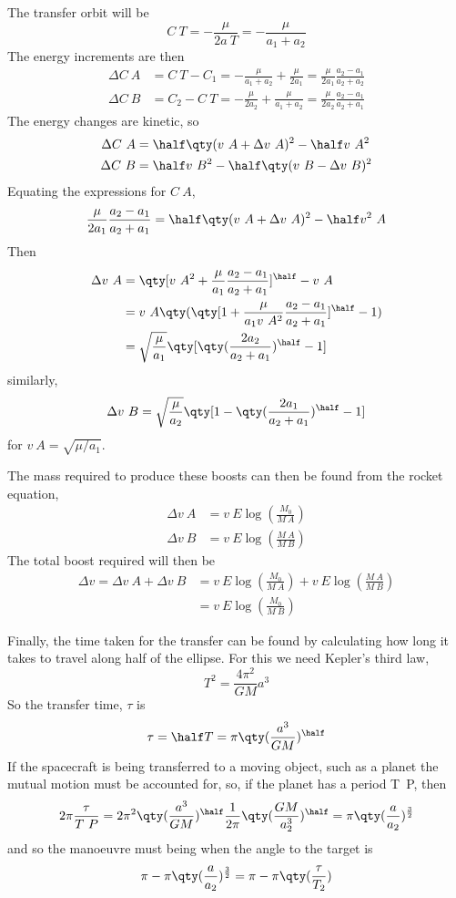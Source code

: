The transfer orbit will be
\[ C~T = - \frac{\mu}{2 a~T} = - \frac{\mu}{a_1+a_2} \]
The energy increments are then
\begin{align*}
  \Delta C~A &= C~T - C_1 = - \frac{\mu}{a_1+a_2} + \frac{\mu}{2 a_1} = \frac{\mu}{2 a_1} \frac{a_2-a_1}{a_2+a_2} \\
\Delta C~B &= C_2 - C~T = - \frac{\mu}{2 a_2} + \frac{\mu}{a_1+a_2} = \frac{\mu}{2a_2} \frac{a_2-a_1}{a_2+ a_1}
\end{align*}
The energy changes are kinetic, so
\begin{align*}
  \Delta C~A &= \half \qty( v~A + \Delta v~A)^2 - \half v~A^2 \\
\Delta C~B &= \half v~B^2 - \half \qty(v~B - \Delta v~B)^2
\end{align*}
Equating the expressions for $C~A$, 
\[ \frac{\mu}{2 a_1} \frac{a_2-a_1}{a_2+a_1} = \half \qty( v~A + \Delta v~A)^2 - \half v^2~A \]
Then
\begin{align}
  \Delta v~A &= \qty[ v~A^2 + \frac{\mu}{a_1} \frac{a_2-a_1}{a_2+a_1}]^{\half} - v~A \nonumber\\
&= v~A \qty( \qty[1+ \frac{\mu}{a_1 v~A^2} \frac{a_2-a_1}{a_2+a_1}]^{\half}-1) \nonumber\\
&= \sqrt{\frac{\mu}{a_1}} \qty[ \qty( \frac{2a_2}{a_2+a_1} )^{\half}-1]
\end{align}
similarly,
\begin{equation}
  \label{eq:4}
  \Delta v~B = \sqrt{\frac{\mu}{a_2}} \qty[ 1-\qty(\frac{2 a_1}{a_2+a_1})^{\half}-1]
\end{equation}
for $v~A = \sqrt{\mu/a_1}$.

The mass required to produce these boosts can then be found from the rocket equation,
\begin{align*}
  \Delta v~A &= v~E \log(\frac{M_0}{M~A}) \\
  \Delta v~B &= v~E \log(\frac{M~A}{M~B})
\end{align*}
The total boost required will then be
\begin{align*} \Delta v = \Delta v~A + \Delta v~B &= v~E \log( \frac{M_0}{M~A} ) + v~E \log( \frac{M~A}{M~B} ) \\ &= v~E \log( \frac{M_0}{M~B} ) 
\end{align*}

Finally, the time taken for the transfer can be found by calculating
how long it takes to travel along half of the ellipse. For this we
need Kepler's third law, 
\begin{equation}
  \label{eq:6}
  T^2 = \frac{4 \pi^2}{GM} a^3
\end{equation}
So the transfer time, $\tau$ is
\begin{equation}
  \label{eq:7}
  \tau = \half T = \pi \qty( \frac{a^3}{GM})^{\half}
\end{equation}
If the spacecraft is being transferred to a moving object, such as a
planet the mutual motion must be accounted for, so, if the planet has
a period T~P, then
\[ 2 \pi \frac{\tau}{T~P} = 2 \pi^2 \qty(\frac{a^3}{GM})^{\half} \frac{1}{2\pi} \qty( \frac{GM}{a_2^3})^{\half} = \pi \qty( \frac{a}{a_2})^{\frac{3}{2}} \]
and so the manoeuvre must being when the angle to the target is
\[ \pi - \pi \qty( \frac{a}{a_2})^{\frac{3}{2}} =\pi-\pi \qty(\frac{\tau}{T_2}) \]

